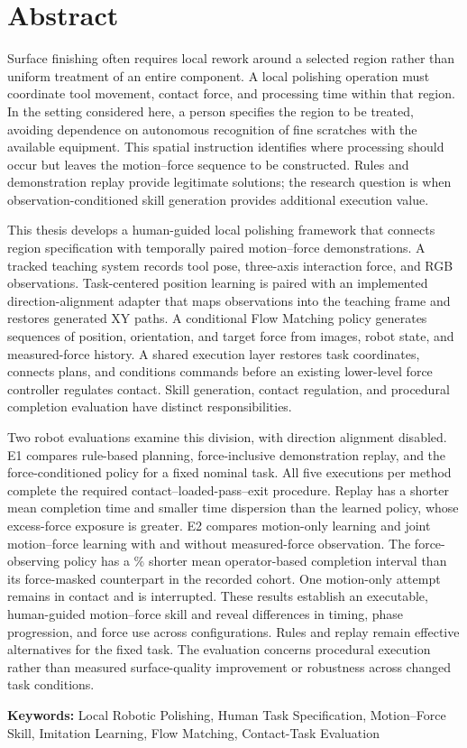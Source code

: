 \chapter*{Abstract}
\begin{center}\large\bfseries\thesistitle\end{center}

Surface finishing often requires local rework around a selected region rather than uniform treatment of an entire component. A local polishing operation must coordinate tool movement, contact force, and processing time within that region. In the setting considered here, a person specifies the region to be treated, avoiding dependence on autonomous recognition of fine scratches with the available equipment. This spatial instruction identifies where processing should occur but leaves the motion--force sequence to be constructed. Rules and demonstration replay provide legitimate solutions; the research question is when observation-conditioned skill generation provides additional execution value.

This thesis develops a human-guided local polishing framework that connects region specification with temporally paired motion--force demonstrations. A tracked teaching system records tool pose, three-axis interaction force, and RGB observations. Task-centered position learning is paired with an implemented direction-alignment adapter that maps observations into the teaching frame and restores generated XY paths. A conditional Flow Matching policy generates sequences of position, orientation, and target force from images, robot state, and measured-force history. A shared execution layer restores task coordinates, connects plans, and conditions commands before an existing lower-level force controller regulates contact. Skill generation, contact regulation, and procedural completion evaluation have distinct responsibilities.

Two robot evaluations examine this division, with direction alignment disabled. E1 compares rule-based planning, force-inclusive demonstration replay, and the force-conditioned policy for a fixed nominal task. All five executions per method complete the required contact--loaded-pass--exit procedure. Replay has a shorter mean completion time and smaller time dispersion than the learned policy, whose excess-force exposure is greater. E2 compares motion-only learning and joint motion--force learning with and without measured-force observation. The force-observing policy has a \BCPercent\% shorter mean operator-based completion interval than its force-masked counterpart in the recorded cohort. One motion-only attempt remains in contact and is interrupted. These results establish an executable, human-guided motion--force skill and reveal differences in timing, phase progression, and force use across configurations. Rules and replay remain effective alternatives for the fixed task. The evaluation concerns procedural execution rather than measured surface-quality improvement or robustness across changed task conditions.

\vspace{0.4cm}
\noindent\textbf{Keywords:} Local Robotic Polishing, Human Task Specification, Motion--Force Skill, Imitation Learning, Flow Matching, Contact-Task Evaluation
